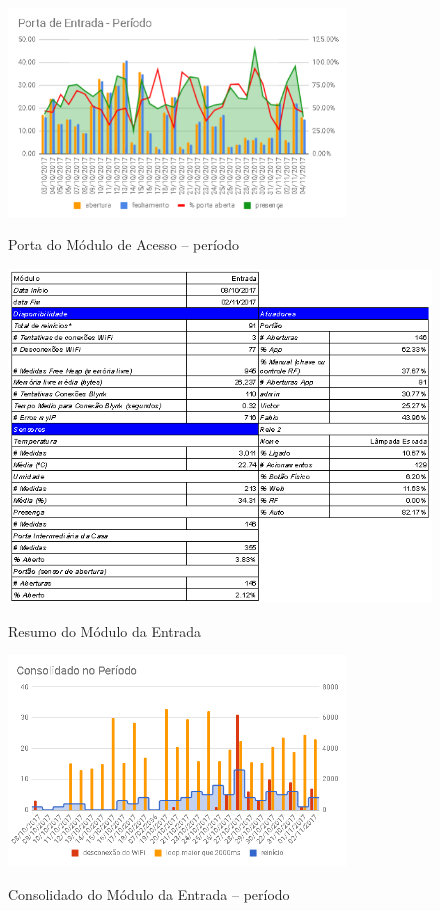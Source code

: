 \begin{figure}[H]
	\centering
	\caption{Porta do Módulo de Acesso -- período}
	\includegraphics[width=0.8\textwidth]{portaentradaperiodo}
	\label{fig:portaentradaperiodo}
\end{figure}

\begin{figure}[H]
	\centering
	\caption{Resumo do Módulo da Entrada}
	\includegraphics[width=1.0\textwidth]{resumoEntrada}
	\label{fig:resumoEntrada}
\end{figure}

\begin{figure}[H]
	\centering
	\caption{Consolidado do Módulo da Entrada -- período}
	\includegraphics[width=0.8\textwidth]{entradaConsolidadoPeriodo}
	\label{fig:entradaConsolidadoPeriodo}
\end{figure}

